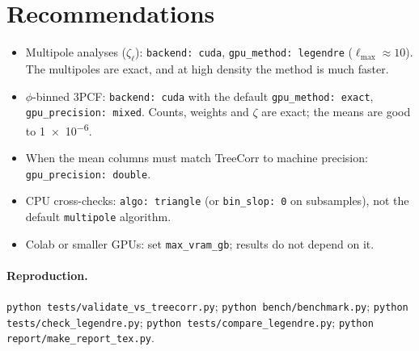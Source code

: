 \documentclass[11pt,a4paper]{article}
\begin{document}
\section{Recommendations}
\begin{itemize}
\item Multipole analyses ($\zeta_\ell$): \texttt{backend: cuda}, \texttt{gpu\_method: legendre}
      ($\ell_\mathrm{max}\approx10$). The multipoles are exact, and at high density the method is
      much faster.
\item $\phi$-binned 3PCF: \texttt{backend: cuda} with the default \texttt{gpu\_method: exact},
      \texttt{gpu\_precision: mixed}. Counts, weights and $\zeta$ are exact; the means are good to
      \num{1e-6}.
\item When the mean columns must match TreeCorr to machine precision: \texttt{gpu\_precision: double}.
\item CPU cross-checks: \texttt{algo: triangle} (or \texttt{bin\_slop: 0} on subsamples), not the
      default \texttt{multipole} algorithm.
\item Colab or smaller GPUs: set \texttt{max\_vram\_gb}; results do not depend on it.
\end{itemize}

\paragraph{Reproduction.} \texttt{python tests/validate\_vs\_treecorr.py};
\texttt{python bench/benchmark.py}; \texttt{python tests/check\_legendre.py};
\texttt{python tests/compare\_legendre.py}; \texttt{python report/make\_report\_tex.py}.
\end{document}

